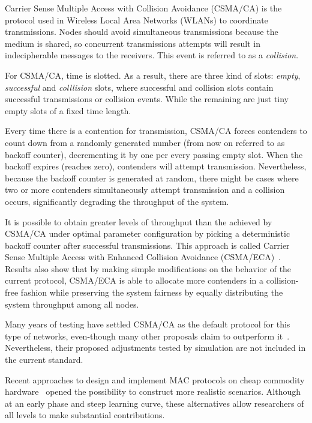 Carrier Sense Multiple Access with Collision Avoidance (CSMA/CA) is the protocol used in Wireless Local Area Networks (WLANs) to coordinate transmissions. Nodes should avoid simultaneous transmissions because the medium is shared, so concurrent transmissions attempts will result in indecipherable messages to the receivers. This event is referred to as a \emph{collision}. 

For CSMA/CA, time is slotted. As a result, there are three kind of slots: \emph{empty}, \emph{successful} and \emph{colllision} slots, where successful and collision slots contain successful transmissions or collision events. While the remaining are just tiny empty slots of a fixed time length.

Every time there is a contention for transmission, CSMA/CA forces contenders to count down from a randomly generated number (from now on referred to as backoff counter), decrementing it by one per every passing empty slot. When the backoff expires (reaches zero), contenders will attempt transmission. Nevertheless, because the backoff counter is generated at random, there might be cases where two or more contenders simultaneously attempt transmission and a collision occurs, significantly degrading the throughput of the system.

It is possible to obtain greater levels of throughput than the achieved by CSMA/CA under optimal parameter configuration by picking a deterministic backoff counter after successful transmissions. This approach is called Carrier Sense Multiple Access with Enhanced Collision Avoidance (CSMA/ECA)~\cite{CSMA_ECA}. Results also show that by making simple modifications on the behavior of the current protocol, CSMA/ECA is able to allocate more contenders in a collision-free fashion while preserving the system fairness by equally distributing the system throughput among all nodes. 
% 

Many years of testing have settled CSMA/CA as the default protocol for this type of networks, even-though many other proposals claim to outperform it~\cite{CSMA_ECA,bellalta2009vtc,L_MAC2,HE}. Nevertheless, their proposed adjustments tested by simulation are not included in the current standard.

Recent approaches to design and implement MAC protocols on cheap commodity hardware~\cite{WMP,FLAVIA} opened the possibility to construct more realistic scenarios. Although at an early phase and steep learning curve, these alternatives allow researchers of all levels to make substantial contributions.

